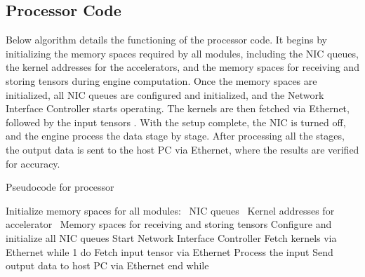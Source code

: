 


\subsection{Processor Code}
Below algorithm details the functioning of the processor code. It begins by initializing the memory spaces required by all modules, including the NIC queues, the kernel addresses for the accelerators, and the memory spaces for receiving and storing tensors during engine computation. Once the memory spaces are initialized, all NIC queues are configured and initialized, and the Network Interface Controller starts operating. The kernels are then fetched via Ethernet, followed by the input tensors . With the setup complete, the NIC is turned off, and the engine process the data stage by stage. After processing all the stages, the output data is sent to the host PC via Ethernet, where the results are verified for accuracy.
\begin{algorithm}
\caption{Pseudocode for processor}
\begin{algorithmic}[1]
    \STATE Initialize memory spaces for all modules:
    \STATE \quad \textbullet\ NIC queues
    \STATE \quad \textbullet\ Kernel addresses for accelerator
    \STATE \quad \textbullet\ Memory spaces for receiving and storing tensors
    \STATE Configure and initialize all NIC queues
    \STATE Start Network Interface Controller
    \STATE Fetch kernels via Ethernet
    \STATE while 1 do
    \STATE \quad Fetch input tensor via Ethernet
    \STATE \quad  Process the input
    \STATE \quad Send output data to host PC via Ethernet
    \STATE end while
\end{algorithmic}
\end{algorithm}

